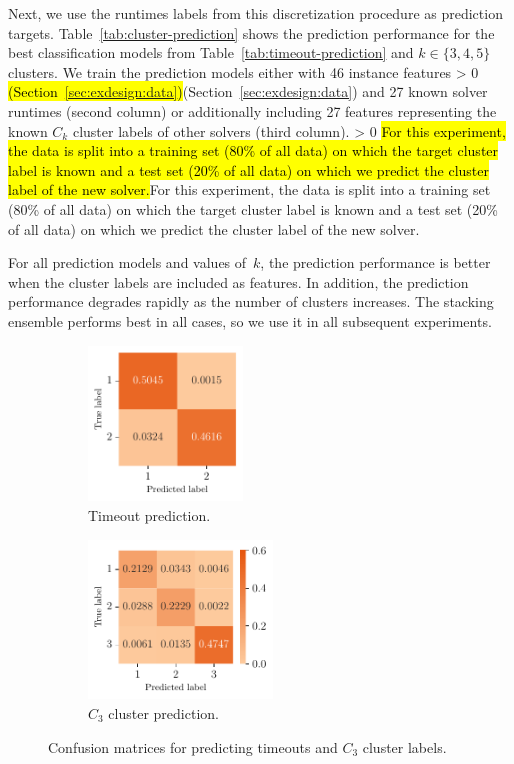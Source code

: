 \documentclass[sn-basic, Numbered]{sn-jnl} %
\newcommand{\showchanges}{1} %
\newcommand{\change}[1]{\ifnum \showchanges > 0 \sethlcolor{yellow}\hl{#1}\else#1\fi}
\begin{document}
Next, we use the runtimes labels from this discretization procedure as prediction targets.
Table~\ref{tab:cluster-prediction} shows the prediction performance for the best classification models from Table~\ref{tab:timeout-prediction} and $k \in \lbrace 3, 4, 5 \rbrace$ clusters.
We train the prediction models either with 46 instance features \change{(Section~\ref{sec:exdesign:data})} and 27 known solver runtimes (second column) or additionally including 27 features representing the known $C_k$ cluster labels of other solvers (third column).
\change{For this experiment, the data is split into a training set (80\% of all data) on which the target cluster label is known and a test set (20\% of all data) on which we predict the cluster label of the new solver.}

For all prediction models and values of~$k$, the prediction performance is better when the cluster labels are included as features.
In addition, the prediction performance degrades rapidly as the number of clusters increases.
The stacking ensemble performs best in all cases, so we use it in all subsequent experiments.

\begin{figure}[tb]
	\centering
	\begin{subfigure}{0.45\textwidth}
		\centering
		\includegraphics[height=4.123cm]{plots/cm2labels.pdf}
		\caption{Timeout prediction.}
	\end{subfigure}
	\begin{subfigure}{0.45\textwidth}
		\centering
		\includegraphics[height=4.228cm]{plots/cm3labels.pdf}
		\caption{$C_3$ cluster prediction.}
	\end{subfigure}
	\caption{Confusion matrices for predicting timeouts and $C_3$ cluster labels.}
	\label{fig:confusion-matrices}
\end{figure}
\end{document}
